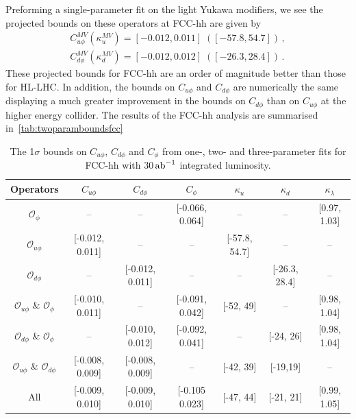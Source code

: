 Preforming a single-parameter fit on the light Yukawa modifiers, we see the projected bounds on these operators at FCC-hh are given by
\begin{equation}
	\begin{split}
		C_{u\phi}^{MV} \left(\kappa_u^{MV}\right) = [-0.012, 0.011] \;([-57.8, 54.7])\,,\\
		C_{d\phi}^{MV} (\kappa_d^{MV}) = [-0.012, 0.012] \;([-26.3, 28.4])\,.
	\end{split}
\end{equation}
These projected bounds for FCC-hh are an order of magnitude better than those for HL-LHC. In addition, the bounds on $C_{u\phi}$ and $C_{d\phi}$ are numerically the same displaying a much greater improvement in the bounds on $C_{d\phi}$ than on $C_{u\phi}$ at the higher energy collider.  The results of the FCC-hh analysis are summarised in~\autoref{tab:twoparamboundsfcc}\\
\begin{table}[]
	\centering
	{\footnotesize
		\begin{tabular}{cccc||ccc}
			\toprule
			Operators &  $C_{u\phi}$&   $C_{d\phi}$&   $C_{\phi}$&    $\kappa_{u}$&   $\kappa_{d}$&   $\kappa_\lambda$\\
			\midrule
			$\mathcal O_{\phi}$ &--   & --            &[-0.066, 0.064] &--  & -- &[0.97, 1.03]\\
			$\mathcal O_{u\phi}$&[-0.012, 0.011]   & --            &-- &[-57.8, 54.7]  & -- &--\\
			$\mathcal O_{d\phi}$&--   & [-0.012, 0.011]            &-- &--  & [-26.3, 28.4] &--\\
			$\mathcal O_{u\phi}$ \& $\mathcal O_{\phi}$ &[-0.010, 0.011]  & --            &[-0.091, 0.042] &[-52, 49] & -- &[0.98, 1.04]\\
			$\mathcal O_{d\phi}$ \& $\mathcal O_{\phi}$ & --             &[-0.010, 0.012]  &[-0.092, 0.041]& -- &[-24, 26] &[0.98, 1.04]\\
			$\mathcal O_{u\phi}$ \& $\mathcal O_{d\phi}$&[-0.008, 0.009]&[-0.008, 0.009]& --            &[-42, 39] &[-19,19] & -- \\
			All                                   &[-0.009, 0.010]&[-0.009, 0.010]& [-0.105 0.023]&[-47, 44] &[-21, 21] & [0.99, 1.05] \\
			\bottomrule
		\end{tabular}
	}
	\caption{ The 1$\sigma$ bounds on $C_{u\phi}$, $C_{d\phi}$ and $C_\phi$ from one-, two- and three-parameter fits for  FCC-hh with 30$\,{\rm ab}^{-1}$ integrated luminosity.}
	\label{tab:twoparamboundsfcc}
\end{table}
